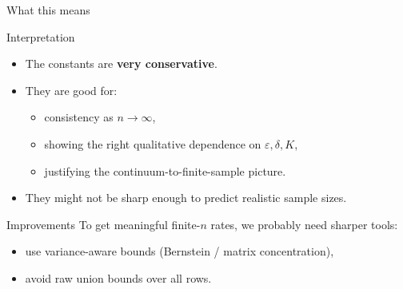 \documentclass[10pt,aspectratio=169]{beamer}
\begin{document}
\begin{frame}{What this means}
	\small
	\begin{block}{Interpretation}
		\begin{itemize}
			\item The constants are \textbf{very conservative}.
			\item They are good for:
			      \begin{itemize}
				      \item consistency as \(n\to\infty\),
				      \item showing the right qualitative dependence on \(\varepsilon,\delta,K\),
				      \item justifying the continuum-to-finite-sample picture.
			      \end{itemize}
			\item They might \alert{not} be sharp enough to predict realistic sample sizes.
		\end{itemize}
	\end{block}

	\begin{block}{Improvements}
		To get meaningful finite-\(n\) rates, we probably need sharper tools:
		\begin{itemize}
			\item use variance-aware bounds (Bernstein / matrix concentration),
			\item avoid raw union bounds over all rows.
		\end{itemize}
	\end{block}

\end{frame}
\end{document}
